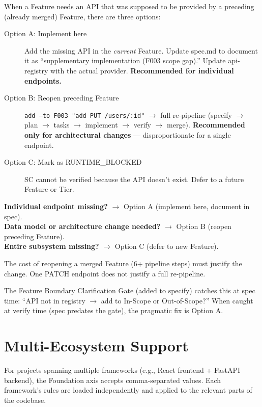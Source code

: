 \documentclass[11pt,a4paper,openright,twoside]{report}
\begin{document}
When a Feature needs an API that was supposed to be provided by a preceding (already merged) Feature, there are three options:

\begin{description}
  \item[Option A: Implement here] Add the missing API in the \emph{current} Feature. Update spec.md to document it as ``supplementary implementation (F003 scope gap).'' Update api-registry with the actual provider. \textbf{Recommended for individual endpoints.}
  \item[Option B: Reopen preceding Feature] \texttt{add --to F003 "add PUT /users/:id"} $\rightarrow$ full re-pipeline (specify $\rightarrow$ plan $\rightarrow$ tasks $\rightarrow$ implement $\rightarrow$ verify $\rightarrow$ merge). \textbf{Recommended only for architectural changes} --- disproportionate for a single endpoint.
  \item[Option C: Mark as RUNTIME\_BLOCKED] SC cannot be verified because the API doesn't exist. Defer to a future Feature or Tier.
\end{description}

\begin{tipbox}
\textbf{Individual endpoint missing?} $\rightarrow$ Option A (implement here, document in spec).\\
\textbf{Data model or architecture change needed?} $\rightarrow$ Option B (reopen preceding Feature).\\
\textbf{Entire subsystem missing?} $\rightarrow$ Option C (defer to new Feature).

The cost of reopening a merged Feature (6+ pipeline steps) must justify the change. One PATCH endpoint does not justify a full re-pipeline.
\end{tipbox}

The Feature Boundary Clarification Gate (added to specify) catches this at spec time: ``API not in registry $\rightarrow$ add to In-Scope or Out-of-Scope?'' When caught at verify time (spec predates the gate), the pragmatic fix is Option A.

\section{Multi-Ecosystem Support}

For projects spanning multiple frameworks (e.g., React frontend + FastAPI backend), the Foundation axis accepts comma-separated values. Each framework's rules are loaded independently and applied to the relevant parts of the codebase.
\end{document}
